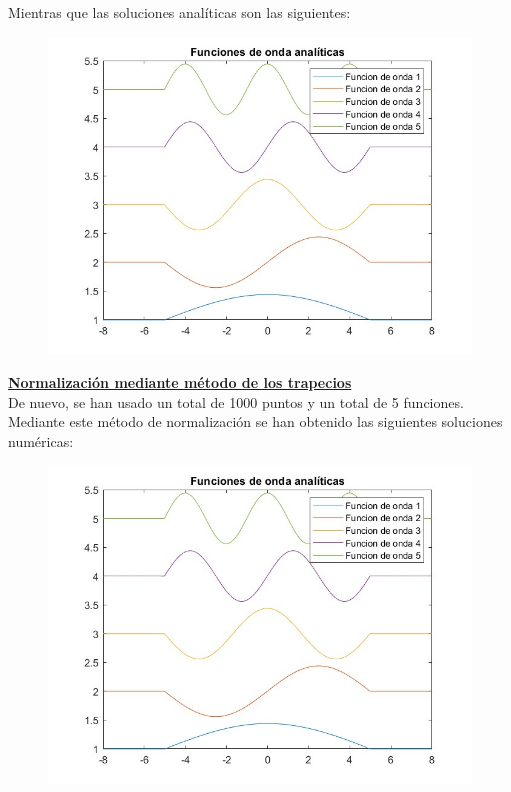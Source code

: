 \documentclass[12pt]{article}
\begin{document}
Mientras que las soluciones analíticas son las siguientes:

\begin{figure}[H]
    \centering
    \includegraphics[scale=0.5]{analiticas.jpg}
\end{figure} 

\textbf{\underline{Normalización mediante método de los trapecios}}\\

De nuevo, se han usado un total de 1000 puntos y un total de 5 
funciones. Mediante este método de normalización se han obtenido
las siguientes soluciones numéricas:

\newpage
\begin{figure}[H]
\centering
\includegraphics[scale=0.5]{trap.jpg}
\end{figure} 
\end{document}
